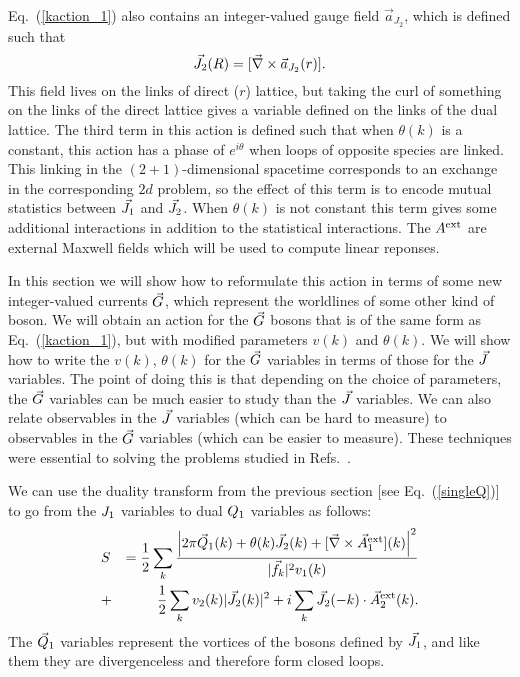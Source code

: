 Eq.~(\ref{kaction_1}) also contains an integer-valued gauge field $\vec{a}_{J_2}$, which is defined such that 
\begin{equation}
\vec{J}_2(R)=[\vec{\nabla}\times\vec{a}_{J_2}(r)].
\label{adef}
\end{equation}
 This field lives on the links of direct ($r$) lattice, but taking the curl of something on the links of the direct lattice gives a variable defined on the links of the dual lattice. The third term in this action is defined such that when $\theta(k)$ is a constant, this action has a phase of $e^{i\theta}$ when loops of opposite species are linked. This linking in the $(2+1)$-dimensional spacetime corresponds to an exchange in the corresponding $2d$ problem, so the effect of this term is to encode mutual statistics between $\vec{J}_1$ and $\vec{J}_2$. When $\theta(k)$ is not constant this term gives some additional interactions in addition to the statistical interactions. The $A^{\rm ext}$ are external Maxwell fields which will be used to compute linear reponses.

In this section we will show how to reformulate this action in terms of some new integer-valued currents $\vec{G}$, which represent the worldlines of some other kind of boson. We will obtain an action for the $\vec{G}$ bosons that is of the same form as Eq.~(\ref{kaction_1}), but with modified parameters $v(k)$ and $\theta(k)$. We will show how to write the $v(k)$, $\theta(k)$ for the $\vec{G}$ variables in terms of those for the $\vec{J}$ variables. The point of doing this is that depending on the choice of parameters, the $\vec{G}$ variables can be much easier to study than the $\vec{J}$ variables. We can also relate observables in the $\vec{J}$ variables (which can be hard to measure) to observables in the $\vec{G}$ variables (which can be easier to measure). These techniques were essential to solving the problems studied in Refs.~\cite{short_range3,Gen2Loops,FQHE}.

We can use the duality transform from the previous section [see Eq.~(\ref{singleQ})] to go from the $J_1$ variables to dual $Q_1$ variables as follows:
\begin{eqnarray}
&S&=\frac{1}{2}\sum_k \frac{\left|2\pi\vec{Q}_1(k)+\theta(k)\vec{J}_2(k)+[\vec{\nabla}\times\vec{A}_{1}^{\rm ext}](k)\right|^2}{|\vec{f}_k|^2v_1(k)}\nonumber\\
&+&\frac{1}{2}\sum_k v_2(k)|\vec{J}_2(k)|^2 + i \sum_k \vec{J}_2(-k) \cdot \vec{A}_{2}^{\rm ext}(k).
\label{JQ1}
\end{eqnarray}
The $\vec{Q}_1$ variables represent the vortices of the bosons defined by $\vec{J}_1$, and like them they are divergenceless and therefore form closed loops.

